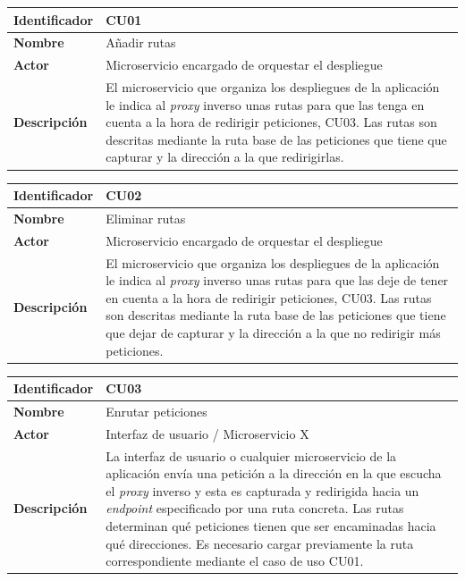 \documentclass[11pt,spanish,listoffigures]{tfgetsinf}
\begin{document}
\begin{center} \begin{tabular}{| l | p{11.3cm} |}
\hline
\textbf{Identificador} & CU01
\\ \hline
\textbf{Nombre} & Añadir rutas
\\ \hline
\textbf{Actor} & Microservicio encargado de orquestar el despliegue
\\ \hline
\textbf{Descripción} & El microservicio que organiza los despliegues de la aplicación le indica al \emph{proxy} inverso unas rutas para que las tenga en cuenta a la hora de redirigir peticiones, CU03. Las rutas son descritas mediante la ruta base de las peticiones que tiene que capturar y la dirección a la que redirigirlas.
\\ \hline \end{tabular} \end{center}

\begin{center} \begin{tabular}{| l | p{11.3cm} |}
\hline
\textbf{Identificador} & CU02
\\ \hline
\textbf{Nombre} & Eliminar rutas
\\ \hline
\textbf{Actor} & Microservicio encargado de orquestar el despliegue
\\ \hline
\textbf{Descripción} & El microservicio que organiza los despliegues de la aplicación le indica al \emph{proxy} inverso unas rutas para que las deje de tener en cuenta a la hora de redirigir peticiones, CU03. Las rutas son descritas mediante la ruta base de las peticiones que tiene que dejar de capturar y la dirección a la que no redirigir más peticiones.
\\ \hline \end{tabular} \end{center}

\begin{center} \begin{tabular}{| l | p{11.3cm} |}
\hline
\textbf{Identificador} & CU03
\\ \hline
\textbf{Nombre} & Enrutar peticiones
\\ \hline
\textbf{Actor} & Interfaz de usuario / Microservicio X
\\ \hline
\textbf{Descripción} & La interfaz de usuario o cualquier microservicio de la aplicación envía una petición a la dirección en la que escucha el \emph{proxy} inverso y esta es capturada y redirigida hacia un \emph{endpoint} especificado por una ruta concreta. Las rutas determinan qué peticiones tienen que ser encaminadas hacia qué direcciones. Es necesario cargar previamente la ruta correspondiente mediante el caso de uso CU01.
\\ \hline \end{tabular} \end{center}
\end{document}
